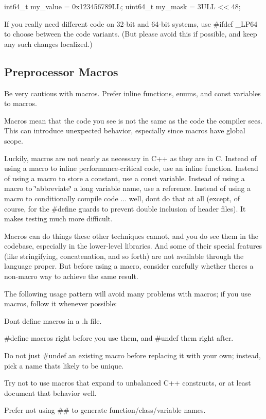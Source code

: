 \begin{DoxyCode}
int64\_t my\_value = 0x123456789LL;
uint64\_t my\_mask = 3ULL << 48;
\end{DoxyCode}
 \begin{DoxyVerb}If you really need different code on 32-bit and 64-bit systems, use #ifdef _LP64 to choose between the code variants. (But please avoid this if possible, and keep any such changes localized.)
\end{DoxyVerb}


\subsection*{Preprocessor Macros}

Be very cautious with macros. Prefer inline functions, enums, and const variables to macros.

Macros mean that the code you see is not the same as the code the compiler sees. This can introduce unexpected behavior, especially since macros have global scope.

Luckily, macros are not nearly as necessary in C++ as they are in C. Instead of using a macro to inline performance-\/critical code, use an inline function. Instead of using a macro to store a constant, use a const variable. Instead of using a macro to \char`\"{}abbreviate\char`\"{} a long variable name, use a reference. Instead of using a macro to conditionally compile code ... well, don\textquotesingle{}t do that at all (except, of course, for the \#define guards to prevent double inclusion of header files). It makes testing much more difficult.

Macros can do things these other techniques cannot, and you do see them in the codebase, especially in the lower-\/level libraries. And some of their special features (like stringifying, concatenation, and so forth) are not available through the language proper. But before using a macro, consider carefully whether there\textquotesingle{}s a non-\/macro way to achieve the same result.

The following usage pattern will avoid many problems with macros; if you use macros, follow it whenever possible\+:


\begin{DoxyItemize}
\item Don\textquotesingle{}t define macros in a .h file.
\item {\ttfamily \#define} macros right before you use them, and {\ttfamily \#undef} them right after.
\item Do not just \#undef an existing macro before replacing it with your own; instead, pick a name that\textquotesingle{}s likely to be unique.
\item Try not to use macros that expand to unbalanced C++ constructs, or at least document that behavior well.
\item Prefer not using \#\# to generate function/class/variable names.
\end{DoxyItemize}

